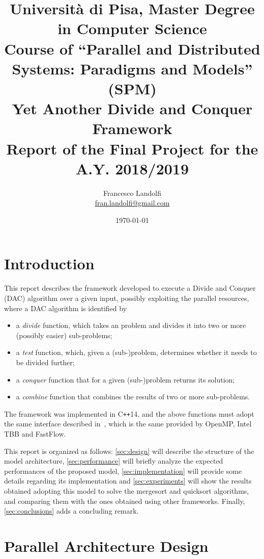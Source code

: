 \documentclass[11pt, a4paper]{article}
\title{{\small Università di Pisa, Master Degree in Computer Science \\[-1.5ex] Course of ``Parallel and Distributed Systems: Paradigms and Models'' (SPM)} \\ \vspace{0.5em}
	Yet Another Divide and Conquer Framework \\\vspace{1ex}
	\large  Report of the Final Project for the A.Y. 2018/2019}
\author{Francesco Landolfi \\ 
	\small \href{mailto:fran.landolfi@gmail.com}{fran.landolfi@gmail.com}}
\date{\today}
\begin{document}
\maketitle

%

\section{Introduction}

This report describes the framework developed to execute a Divide and Conquer (DAC) algorithm over a given input, possibly exploiting the parallel resources, where a DAC algorithm is identified by
%
\begin{itemize}
	\item a \emph{divide} function, which takes an problem and divides it into two or more (possibly easier) sub-problems;
	\item a \emph{test} function, which, given a (sub-)problem, determines whether it needs to be divided further;
	\item a \emph{conquer} function that for a given (sub-)problem returns its solution;
	\item a \emph{combine} function that combines the results of two or more sub-problems.
\end{itemize}
%
The framework was implemented in C{\tt ++}14, and the above functions must adopt the same interface described in~\cite{danelutto2016divide}, which is the same provided by OpenMP, Intel TBB and FastFlow.

This report is organized as follows: \autoref{sec:design} will describe the structure of the model architecture, \autoref{sec:performance} will briefly analyze the expected performances of the proposed model, \autoref{sec:implementation} will provide some details regarding its implementation and \autoref{sec:experiments} will show the results obtained adopting this model to solve the mergesort and quicksort algorithms, and comparing them with the ones obtained using other frameworks. Finally, \autoref{sec:conclusions} adds a concluding remark.

\section{Parallel Architecture Design}\label{sec:design}
\end{document}
